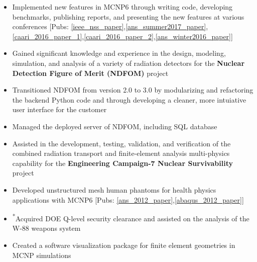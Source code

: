\begin{minipage}{\textwidth}
    \begin{center}
	\begin{itemize}
	    \item Implemented new features in \textsc{MCNP6} through writing code, developing benchmarks, publishing reports, 
		    and presenting the new features at various conferences [Pubs: \ref{ieee_nss_paper},\ref{ans_summer2017_paper},\ref{caari_2016_paper_1},\ref{caari_2016_paper_2},\ref{ans_winter2016_paper}]\none 
		\item Gained significant knowledge and experience in the design, modeling, simulation, and analysis 
		    of a variety of radiation detectors for the \textbf{Nuclear Detection Figure of Merit (NDFOM)} project\ntwo
	    \item Transitioned NDFOM from version 2.0 to 3.0 by modularizing and refactoring the backend 
		   Python code and through developing a cleaner, more intuiative user interface for the customer\ntwo
	    \item Managed the deployed server of NDFOM, including SQL database\ntwo
	    \item Assisted in the development, testing, validation, and verification of the combined radiation transport and 
		    finite-element analysis multi-physics capability for the \textbf{Engineering Campaign-7 Nuclear Survivability} project\nthree
	    \item Developed unstructured mesh human phantoms for health physics applications with \textsc{MCNP6} [Pubs: \ref{ans_2012_paper},\ref{abaqus_2012_paper}]\nthree
	    \item \textsuperscript{*}Acquired DOE Q-level security clearance and assisted on the analysis of the W-88 weapons system\nthree
	    \item Created a software visualization package for finite element geometries in MCNP simulations\nfour

\end{itemize}
\end{center}
\end{minipage}
